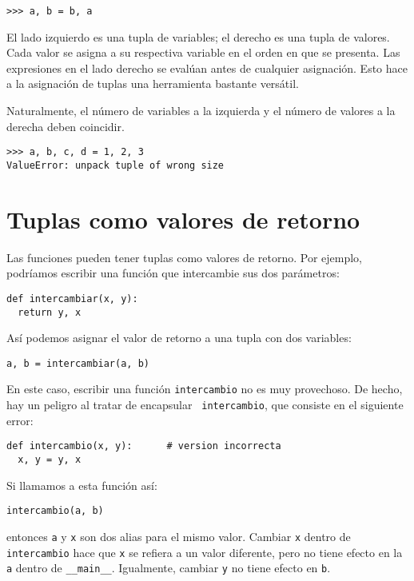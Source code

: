 \beforeverb
\begin{verbatim}
>>> a, b = b, a
\end{verbatim}
\afterverb
%
El lado izquierdo es una tupla de variables; el derecho es una tupla
de valores. Cada valor se asigna a su respectiva variable en el orden 
en que se presenta. Las expresiones en el lado derecho se evalúan
antes de cualquier asignación. Esto hace a la asignación de tuplas
una herramienta bastante versátil.

Naturalmente, el número de variables a la izquierda y el número de
valores a la derecha deben coincidir.

\beforeverb
\begin{verbatim}
>>> a, b, c, d = 1, 2, 3
ValueError: unpack tuple of wrong size
\end{verbatim}
\afterverb
%

\section{Tuplas como valores de retorno}

Las funciones pueden tener tuplas como valores de retorno. Por
ejemplo, podríamos escribir una función que intercambie sus
dos parámetros:

\beforeverb
\begin{verbatim}
def intercambiar(x, y):
  return y, x
\end{verbatim}
\afterverb
%
Así podemos asignar el valor de retorno a una tupla con dos variables:

\beforeverb
\begin{verbatim}
a, b = intercambiar(a, b)
\end{verbatim}
\afterverb
%
En este caso, escribir una función  \texttt{intercambio} no es muy 
provechoso. De hecho, hay un peligro al tratar de encapsular {\tt
intercambio}, que consiste en el siguiente error:

\beforeverb
\begin{verbatim}
def intercambio(x, y):      # version incorrecta
  x, y = y, x
\end{verbatim}
\afterverb
%
Si llamamos a esta función así:

\beforeverb
\begin{verbatim}
intercambio(a, b)
\end{verbatim}
\afterverb
%
entonces \texttt{a} y \texttt{x} son dos alias para el mismo valor.  Cambiar \texttt{x}
dentro de \texttt{intercambio} hace que  \texttt{x} se refiera a un valor diferente, 
pero no tiene efecto en la \texttt{a} dentro de  \texttt{\_\_main\_\_}.  Igualmente, 
cambiar \texttt{y} no tiene efecto en  \texttt{b}.

